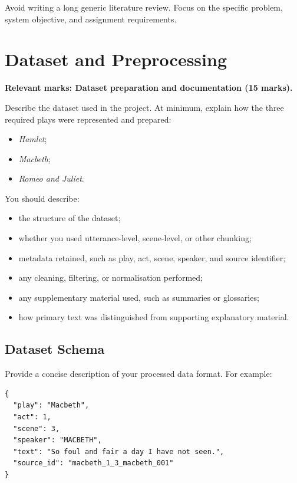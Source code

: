 \documentclass[10pt,conference]{IEEEtran}
\begin{document}
Avoid writing a long generic literature review. 
Focus on the specific problem, system objective, and assignment requirements.

\section{Dataset and Preprocessing}
\label{sec:dataset}

\textbf{Relevant marks: Dataset preparation and documentation (15 marks).}

Describe the dataset used in the project. 
At minimum, explain how the three required plays were represented and prepared:

\begin{itemize}
    \item \textit{Hamlet};
    \item \textit{Macbeth};
    \item \textit{Romeo and Juliet}.
\end{itemize}

You should describe:

\begin{itemize}
    \item the structure of the dataset;
    \item whether you used utterance-level, scene-level, or other chunking;
    \item metadata retained, such as play, act, scene, speaker, and source identifier;
    \item any cleaning, filtering, or normalisation performed;
    \item any supplementary material used, such as summaries or glossaries;
    \item how primary text was distinguished from supporting explanatory material.
\end{itemize}

\subsection{Dataset Schema}

Provide a concise description of your processed data format. 
For example:

\begin{verbatim}
{
  "play": "Macbeth",
  "act": 1,
  "scene": 3,
  "speaker": "MACBETH",
  "text": "So foul and fair a day I have not seen.",
  "source_id": "macbeth_1_3_macbeth_001"
}
\end{verbatim}
\end{document}
